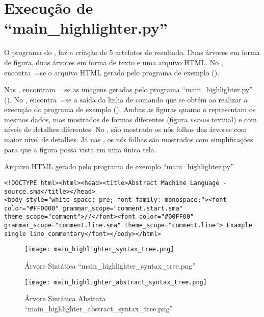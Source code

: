\chapter[main\_highlighter.py]{Execução de ``main\_highlighter.py''}

O programa do ,
faz a criação de 5 artefatos de resultado.
Duas árvores em forma de figura,
duas árvores em forma de texto e
uma arquivo HTML.
No ,
encontra~=se o arquivo HTML gerado pelo programa de exemplo ().

Nas ,
encontram~=se as imagens geradas pelo programa ``main\_highlighter.py'' ().
No ,
encontra~=se a saída da linha de comando que se obtém ao realizar a execução do programa de exemplo ().
Ambas as figuras  quanto o  representam os mesmos dados,
mas mostrados de formas diferentes (figura \textit{versus} textual) e
com níveis de detalhes diferentes.
No ,
são mostrado os nós folhas das árvores com maior nível de detalhes.
Já nas ,
os nós folhas são mostrados com simplificações para que a figura possa vista em uma única tela.
\begin{code}
\caption{Arquivo HTML gerado pelo programa de exemplo ``main\_highlighter.py''}
\label{MainHighlighterHtml}
\begin{verbatim}
<!DOCTYPE html><html><head><title>Abstract Machine Language - source.sma</title></head>
<body style="white-space: pre; font-family: monospace;"><font color="#FF0000" grammar_scope="comment.start.sma" theme_scope="comment">//</font><font color="#00FF00" grammar_scope="comment.line.sma" theme_scope="comment.line"> Example single line commentary</font></body></html>
\end{verbatim}
\end{code}

\begin{figure}[!htb]
\caption{Árvore Sintática ``main\_highlighter\_syntax\_tree.png''}
\label{MainHighlighterSyntaxTree}
\centering
\texttt{[image: main\_highlighter\_syntax\_tree.png]}
\end{figure}

\begin{figure}[!htb]
\caption{Árvore Sintática Abstrata ``main\_highlighter\_abstract\_syntax\_tree.png''}
\label{MainHighlighterAbstractSyntaxTree}
\centering
\texttt{[image: main\_highlighter\_abstract\_syntax\_tree.png]}
\end{figure}


